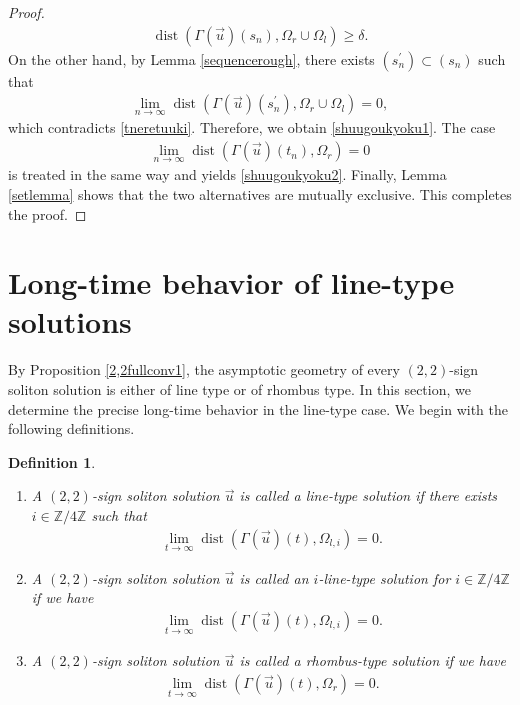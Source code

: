 \documentclass[10pt,a4paper]{amsart}
\newtheorem{definition}{Definition}[section]
\numberwithin{equation}{section}
\begin{document}
\begin{proof}
\begin{align}\label{tneretuuki}
\operatorname{dist}\left(\Gamma(\vec{u})(s_n),\Omega_r\cup \Omega_l\right)\geq \delta.
\end{align}
On the other hand, by Lemma \ref{sequencerough}, there exists $(s_n^{\prime})\subset (s_n)$ such that 
\begin{align*}
\lim_{n\to\infty}\operatorname{dist}\left(\Gamma(\vec{u})(s_n^{\prime}),\Omega_r\cup \Omega_l\right)=0,
\end{align*}
which contradicts \eqref{tneretuuki}. Therefore, we obtain \eqref{shuugoukyoku1}. The case
\begin{align*}
\lim_{n\to\infty}\operatorname{dist}\left(\Gamma(\vec{u})(t_n),\Omega_r\right)=0
\end{align*}
is treated in the same way and yields \eqref{shuugoukyoku2}. Finally, Lemma \ref{setlemma} shows that the two alternatives are mutually exclusive. This completes the proof.
\end{proof}


\section{Long-time behavior of line-type solutions}

By Proposition \ref{2,2fullconv1}, the asymptotic geometry of every $(2,2)$-sign soliton solution is either of line type or
of rhombus type. In this section, we determine the precise long-time behavior in the line-type case. We begin with the
following definitions.

\begin{definition}\label{typedef}
\begin{enumerate}
\item A $(2,2)$-sign soliton solution $\vec{u}$ is called a \textit{line-type solution} if there exists $i\in \mathbb{Z}/4\mathbb{Z}$ such that 
\begin{align}\label{linetypedefes}
\lim_{t\to\infty}\operatorname{dist}(\Gamma(\vec{u})(t),\Omega_{l,i})=0.
\end{align}

\item A $(2,2)$-sign soliton solution $\vec{u}$ is called an \textit{$i$-line-type solution} for $i\in\mathbb{Z}/4\mathbb{Z}$ if we have
\begin{align}\label{i-typedefes}
\lim_{t\to\infty}\operatorname{dist}(\Gamma(\vec{u})(t),\Omega_{l,i})=0.
\end{align}

\item A $(2,2)$-sign soliton solution $\vec{u}$ is called a \textit{rhombus-type solution} if we have
\begin{align}\label{hishidefes}
\lim_{t\to\infty}\operatorname{dist}(\Gamma(\vec{u})(t),\Omega_r)=0.
\end{align}
\end{enumerate}
\end{definition}
\end{document}
